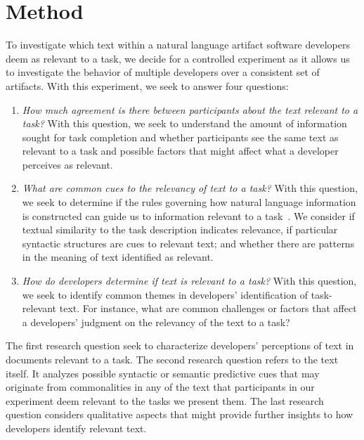 \section{Method}
\label{cp3:method}




To investigate which text within a natural language artifact software developers deem as relevant to a task,
 we decide for a controlled experiment
 as it allows us to investigate the behavior of multiple developers
over a consistent set of artifacts.
With this experiment, we seek to answer four questions:


\begin{enumerate}[label=\textit{RQ\arabic*},leftmargin=*]



    \item \textit{How much agreement is there between participants about the text
    relevant to a task?} With this question, we seek to understand
    the amount of information sought for task completion
    and whether participants see the same text as
    relevant to a task and possible factors that might affect what a developer perceives as relevant.

    \item \textit{What are common cues to the relevancy of text to a task?}
    With this question, we seek to determine if the rules governing how natural language information
    is constructed can guide us to information relevant to a task~\cite{Kintsch1978a}.
    We consider if textual similarity to the task description indicates relevance, if
  particular  syntactic structures are cues to relevant text; and whether there
    are patterns in the meaning of text identified as relevant.

    \item \textit{How do developers determine if text is relevant to a task?}
    With this question, we seek to identify common themes in developers' identification of task-relevant text. For instance, what are common challenges or factors that affect a developers' judgment on the relevancy of the text to a task?

\end{enumerate}



The first research question seek to characterize developers' perceptions of text
in documents relevant to a task.
The second research question refers to the text itself.
It analyzes possible syntactic or semantic
predictive cues that may originate from commonalities in any of the text that participants in our experiment deem relevant to the tasks we present them.
The last research question considers qualitative aspects that might provide
further insights to how developers identify relevant text.

